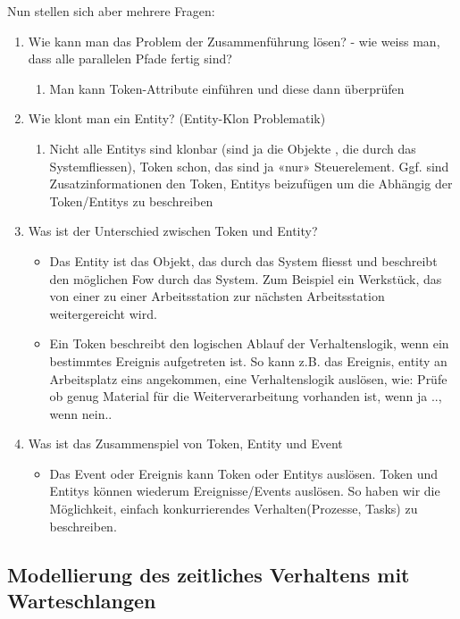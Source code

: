 Nun stellen sich aber mehrere Fragen:
\begin{enumerate}
    \item Wie kann man das Problem der Zusammenführung lösen? - wie weiss man, dass alle parallelen Pfade fertig sind?
    \begin{enumerate}
        \item Man kann Token-Attribute einführen und diese dann überprüfen
    \end{enumerate}
    \item Wie klont man ein Entity? (Entity-Klon Problematik)
    \begin{enumerate}
        \item Nicht alle Entitys sind klonbar (sind ja die Objekte , die durch das Systemfliessen), Token schon, das sind ja «nur» Steuerelement. Ggf. sind Zusatzinformationen den Token, Entitys beizufügen um die Abhängig der Token/Entitys zu beschreiben
    \end{enumerate}
\item Was ist der Unterschied zwischen Token und Entity?
\begin{itemize}
    \item Das Entity ist das Objekt, das durch das System fliesst und beschreibt den möglichen Fow durch das System.
    Zum Beispiel ein Werkstück, das von einer zu einer Arbeitsstation zur nächsten Arbeitsstation weitergereicht wird.
    \item Ein Token beschreibt den logischen Ablauf der Verhaltenslogik, wenn ein bestimmtes Ereignis aufgetreten ist. So kann z.B. das Ereignis, entity an Arbeitsplatz eins angekommen, eine Verhaltenslogik auslösen, wie: Prüfe ob genug Material für die Weiterverarbeitung vorhanden ist, wenn ja .., wenn nein..   
\end{itemize}
\item Was ist das Zusammenspiel von Token, Entity und Event 
\begin{itemize}
    \item Das Event oder Ereignis kann Token oder Entitys auslösen. Token und Entitys können wiederum Ereignisse/Events auslösen. So haben wir die Möglichkeit, einfach konkurrierendes Verhalten(Prozesse, Tasks) zu beschreiben.
\end{itemize}
\end{enumerate}

\subsection{Modellierung des zeitliches Verhaltens mit Warteschlangen}
